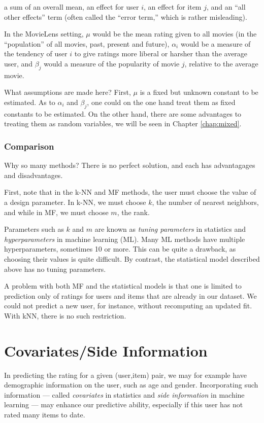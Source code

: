a sum of an overall mean, an effect for user $i$, an effect for item
$j$, and an ``all other effects'' term (often called the ``error term,''
which is rather misleading).  

In the MovieLens setting, $\mu$ would be the mean rating given to all
movies (in the ``population'' of all movies, past, present and future),
$\alpha_i$ would be a measure of the tendency of user $i$ to give
ratings more liberal or harsher than the average user, and $\beta_j$
would a measure of the popularity of movie $j$, relative to the average
movie.

What assumptions are made here?  First, $\mu$ is a fixed but unknown
constant to be estimated.  As to $\alpha_i$ and $\beta_j$, one could on
the one hand treat them as fixed constants to be estimated.  On the
other hand, there are some advantages to treating them as random
variables, we will be seen in Chapter \ref{chap:mixed}.

\subsubsection{Comparison}

Why so many methods?  There is no perfect solution, and each has
advantagages and disadvantages.

First, note that in the k-NN and MF methods, the user must choose the
value of a design parameter.  In k-NN, we must choose $k$, the number of
nearest neighbors, and while in MF, we must choose $m$, the rank.

Parameters such as $k$ and $m$ are known as \textit{tuning parameters}
in statistics and \textit{hyperparameters} in machine learning (ML).
Many ML methods have multiple hyperparameters, sometimes 10 or more.
This can be quite a drawback, as choosing their values is quite
difficult.  By contrast, the statistical model described above has no
tuning parameters.

A problem with both MF and the statistical models is that one is limited
to prediction only of ratings for users and items that are already in
our dataset.  We could not predict a new user, for instance, without
recomputing an updated fit.  With kNN, there is no such restriction.

\section{Covariates/Side Information}

In predicting the rating for a given (user,item) pair, we may for
example have demographic information on the user, such as age and
gender.  Incorporating such information --- called \textit{covariates}
in statistics and \textit{side information} in machine learning --- may
enhance our predictive ability, especially if this user has not rated
many items to date.

